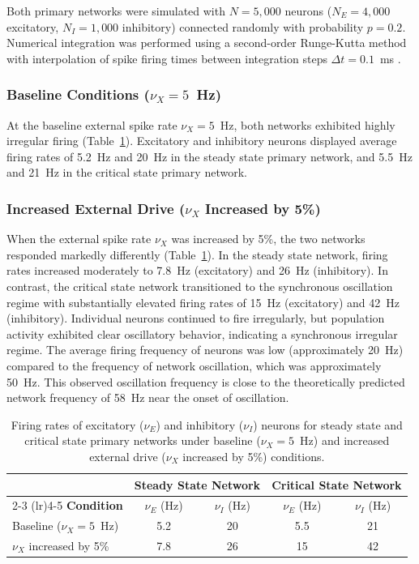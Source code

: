 \documentclass[12pt]{article}
\begin{document}
Both primary networks were simulated with $N = 5{,}000$ neurons ($N_E = 4{,}000$ excitatory, $N_I = 1{,}000$ inhibitory) connected randomly with probability $p = 0.2$. Numerical integration was performed using a second-order Runge-Kutta method with interpolation of spike firing times between integration steps $\Delta t = 0.1$~ms \citep{Hansel1998}.

\subsubsection{Baseline Conditions ($\nu_X = 5$~Hz)}

At the baseline external spike rate $\nu_X = 5$~Hz, both networks exhibited highly irregular firing (Table~\ref{tab:firing_rates}). Excitatory and inhibitory neurons displayed average firing rates of 5.2~Hz and 20~Hz in the steady state primary network, and 5.5~Hz and 21~Hz in the critical state primary network.

\subsubsection{Increased External Drive ($\nu_X$ Increased by 5\%)}

When the external spike rate $\nu_X$ was increased by 5\%, the two networks responded markedly differently (Table~\ref{tab:firing_rates}). In the steady state network, firing rates increased moderately to 7.8~Hz (excitatory) and 26~Hz (inhibitory). In contrast, the critical state network transitioned to the synchronous oscillation regime with substantially elevated firing rates of 15~Hz (excitatory) and 42~Hz (inhibitory). Individual neurons continued to fire irregularly, but population activity exhibited clear oscillatory behavior, indicating a synchronous irregular regime. The average firing frequency of neurons was low (approximately 20~Hz) compared to the frequency of network oscillation, which was approximately 50~Hz. This observed oscillation frequency is close to the theoretically predicted network frequency of 58~Hz near the onset of oscillation.

\begin{table}[htbp]
\centering
\caption{Firing rates of excitatory ($\nu_E$) and inhibitory ($\nu_I$) neurons for steady state and critical state primary networks under baseline ($\nu_X = 5$~Hz) and increased external drive ($\nu_X$ increased by 5\%) conditions.}
\label{tab:firing_rates}
\begin{tabular}{lcccc}
\toprule
& \multicolumn{2}{c}{\textbf{Steady State Network}} & \multicolumn{2}{c}{\textbf{Critical State Network}} \\
\cmidrule(lr){2-3} \cmidrule(lr){4-5}
\textbf{Condition} & $\nu_E$ (Hz) & $\nu_I$ (Hz) & $\nu_E$ (Hz) & $\nu_I$ (Hz) \\
\midrule
Baseline ($\nu_X = 5$~Hz) & 5.2 & 20 & 5.5 & 21 \\
$\nu_X$ increased by 5\% & 7.8 & 26 & 15 & 42 \\
\bottomrule
\end{tabular}
\end{table}
\end{document}
